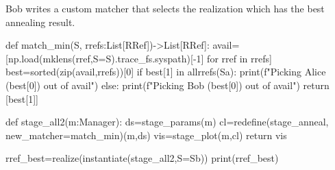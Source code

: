 \mystdout


Bob writes a custom matcher that selects the realization which has the best
annealing result.

\begin{pythontexcode}
def match_min(S, rrefs:List[RRef])->List[RRef]:
  avail=[np.load(mklens(rref,S=S).trace_fs.syspath)[-1] for rref in rrefs]
  best=sorted(zip(avail,rrefs))[0]
  if best[1] in allrrefs(Sa):
    print(f"Picking Alice ({best[0]}) out of {avail}")
  else:
    print(f"Picking Bob ({best[0]}) out of {avail}")
  return [best[1]]

def stage_all2(m:Manager):
  ds=stage_params(m)
  cl=redefine(stage_anneal, new_matcher=match_min)(m,ds)
  vis=stage_plot(m,cl)
  return vis

rref_best=realize(instantiate(stage_all2,S=Sb))
print(rref_best)
\end{pythontexcode}

\mystdout
